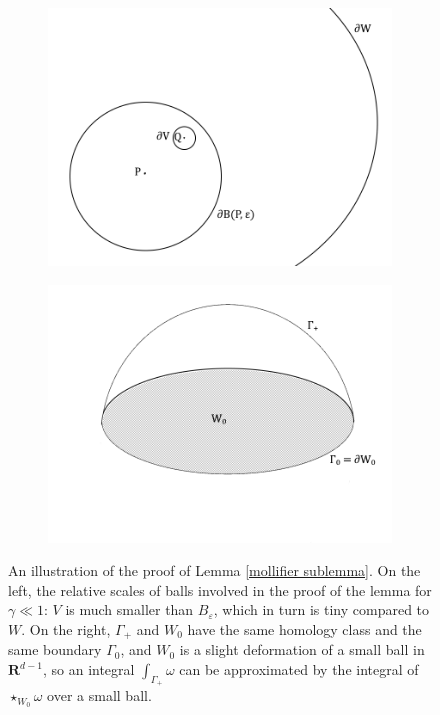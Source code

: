 \documentclass[reqno,11pt]{amsart}
\newcommand{\RR}{\mathbf{R}}
\theoremstyle{definition}
\numberwithin{equation}{section}
\begin{document}
\begin{figure}
\centering
\begin{subfigure}[b]{0.4\linewidth}
\includegraphics[width=\linewidth]{estimating_scales.png}
\end{subfigure}
\begin{subfigure}[b]{0.4\linewidth}
\includegraphics[width=\linewidth]{estimate homotopy.png}
\end{subfigure}
\caption{An illustration of the proof of Lemma \ref{mollifier sublemma}. On the left, the relative scales of balls involved in the proof of the lemma for $\gamma \ll 1$: $V$ is much smaller than $B_\varepsilon$, which in turn is tiny compared to $W$. On the right, $\Gamma_+$ and $W_0$ have the same homology class and the same boundary $\Gamma_0$, and $W_0$ is a slight deformation of a small ball in $\RR^{d - 1}$, so an integral $\int_{\Gamma_+} \omega$ can be approximated by the integral of $\star_{W_0} \omega$ over a small ball.}
\label{estimating figures}
\end{figure}
\end{document}
